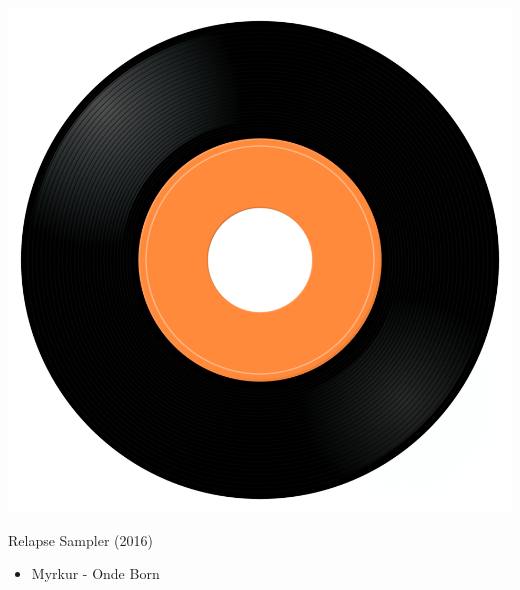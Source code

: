 \begin{minipage}[t]{0.25\textwidth}\vspace{0pt}
\captionsetup{type=figure}
\includegraphics[width=\textwidth]{Images/cover.png}
\caption*{Relapse Sampler (2016)}
\end{minipage}
\begin{minipage}[t]{0.25\textwidth}\vspace{0pt}
\begin{itemize}[nosep,leftmargin=1em,labelwidth=*,align=left]
	\setlength{\itemsep}{0pt}
	\item Myrkur - Onde Born 
\end{itemize}
\end{minipage}
